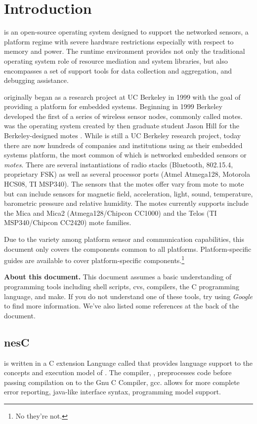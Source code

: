 \section{Introduction}

\tinyos is an open-source operating system designed to 
support the networked sensors, a platform regime with
severe hardware restrictions especially with respect to memory and power. 
The \tinyos runtime environment provides not only the traditional
operating system role of resource mediation and system libraries, but
also encompasses a set of support tools for data collection and
aggregation, and debugging assistance. 

\tinyos originally began as a research project at UC Berkeley in 1999
with the goal of providing a platform for embedded systems. Beginning
in 1999 Berkeley developed the first of a series of wireless sensor
nodes, commonly called motes. \tinyos was the operating system
created by then graduate student Jason Hill for the Berkeley-designed
motes \cite{jhill-thesis}. While \tinyos is still a UC Berkeley research project, today
there are now hundreds of companies and institutions using \tinyos as
their embedded systems platform, the most common of which is networked
embedded sensors or \emph{motes}. There are several instantiations of
\tinyos radio stacks (Bluetooth, 802.15.4, proprietary FSK) as well as several
processor ports (Atmel Atmega128, Motorola HCS08, TI MSP340).  The
sensors that the motes offer vary from mote to mote but can include
sensors for magnetic field, acceleration, light, sound, temperature,
barometric pressure and relative humidity.  The motes \tinyos
currently supports include the Mica and Mica2 (Atmega128/Chipcon
CC1000) and the Telos (TI MSP340/Chipcon CC2420) mote families.

Due to the variety among platform sensor and communication capabilities,
this document only covers the \tinyos components common to all platforms.
Platform-specific guides are available to cover platform-specific
components.\footnote{No they're not.}

{\bf About this document.} This document assumes a basic understanding
of programming tools including shell scripts, cvs, compilers, the C
programming language, and make. If you do not understand one of 
these tools, try using \emph{Google} to
find more information. We've also listed some references at the back 
of the document.

\subsection{nesC}
\tinyos is written in a C extension Language called \nesc that provides
language support to the concepts and execution model of \tinyos . The
\nesc compiler, \ncc, preprocesses \tinyos code before passing
compilation on to the Gnu C Compiler, gcc. \nesc allows for more
complete error reporting, java-like interface syntax, programming
model support. 

